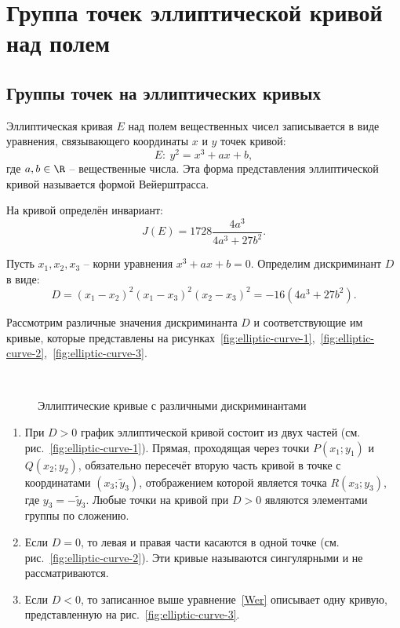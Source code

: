 \section{Группа точек эллиптической кривой над полем}\label{section-math-ec-groups}

\subsection{Группы точек на эллиптических кривых}

Эллиптическая кривая $E$ над полем вещественных чисел записывается в виде уравнения, связывающего координаты $x$ и $y$ точек кривой:
\begin{equation}
    E: ~ y^{2} = x^{3} + ax + b,
    \label{Wer}
\end{equation}
где $a,b \in \R$ -- вещественные числа. Эта форма представления эллиптической кривой называется формой Вейерштрасса.

На кривой определён инвариант:
\begin{equation}
    J(E)=1728\frac{4a^{3} }{4a^{3} +27b^{2} }.
\end{equation}

Пусть $x_{1} ,x_{2} ,x_{3} $ -- корни уравнения $x^3 + a x + b = 0$. Определим дискриминант $D$ в виде:
    \[ D =(x_1 - x_2)^2 (x_1 - x_3)^2 (x_2 - x_3)^2 = - 16(4 a^3 + 27 b^2). \]

Рассмотрим различные значения дискриминанта $D$ и соответствующие им кривые, которые представлены на рисунках~\ref{fig:elliptic-curve-1},~\ref{fig:elliptic-curve-2},~\ref{fig:elliptic-curve-3}.

\begin{figure}[thb]
	\centering 
	~~~~
	~~~~
	\caption{Эллиптические кривые с различными дискриминантами}
\end{figure}

\begin{enumerate}
    \item При $D>0$ график эллиптической кривой состоит из двух частей (см. рис.~\ref{fig:elliptic-curve-1}). Прямая, проходящая через точки $P(x_1; y_1)$ и $Q(x_2; y_2)$, обязательно пересечёт вторую часть кривой в точке с координатами $(x_3; \widetilde{y}_3)$, отображением которой является точка $R(x_3; y_3)$, где $y_3 = - \widetilde{y}_3$. Любые точки на кривой при $D>0$ являются элементами группы по сложению.
    \item Если $D=0$, то левая и правая части касаются в одной точке (см. рис.~\ref{fig:elliptic-curve-2}). Эти кривые называются сингулярными и не рассматриваются.
    \item Если $D<0$, то записанное выше уравнение~\ref{Wer} описывает одну кривую, представленную на рис.~\ref{fig:elliptic-curve-3}.
\end{enumerate}

